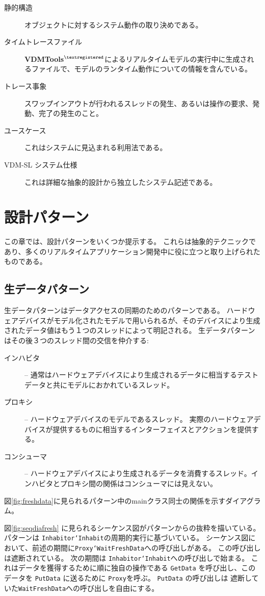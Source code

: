 \documentclass[\pformat,12pt]{jreport}
\newcommand{\vdmtools}{\textbf{VDMTools}$^{\mathbf{{\textregistered}}}$}
\begin{document}
\begin{description}
\item[静的構造] オブジェクトに対するシステム動作の取り決めである。
\item[タイムトレースファイル]  \vdmtools によるリアルタイムモデルの実行中に生成されるファイルで、モデルのランタイム動作についての情報を含んでいる。
\item[トレース事象] スワップインアウトが行われるスレッドの発生、あるいは操作の要求、発動、完了の発生のこと。
\item[ユースケース] これはシステムに見込まれる利用法である。
\item[VDM-SL システム仕様] これは詳細な抽象的設計から独立したシステム記述である。
\end{description}


\chapter{設計パターン}\label{app:patterns}

この章では、設計パターンをいくつか提示する。
これらは抽象的テクニックであり、多くのリアルタイムアプリケーション開発中に役に立つと取り上げられたものである。

\section{生データパターン}

生データパターンはデータアクセスの同期のためのパターンである。
ハードウェアデバイスがモデル化されたモデルで用いられるが、そのデバイスにより生成されたデータ値はもう１つのスレッドによって明記される。
生データパターンはその後３つのスレッド間の交信を仲介する:

\begin{description}
\item[インハビタ] -- 通常はハードウェアデバイスにより生成されるデータに相当するテストデータと共にモデルにおかれているスレッド。
\item[プロキシ] -- ハードウェアデバイスのモデルであるスレッド。
実際のハードウェアデバイスが提供するものに相当するインターフェイスとアクションを提供する。
\item[コンシューマ] -- ハードウェアデバイスにより生成されるデータを消費するスレッド。インハビタとプロキシ間の関係はコンシューマには見えない。
\end{description}

 図\ref{fig:freshdata}に見られるパターン中のmainクラス同士の関係を示すダイアグラム。

 図\ref{fig:seqdiafresh} に見られるシーケンス図がパターンからの抜粋を描いている。
パターンは \texttt{Inhabitor`Inhabit}の周期的実行に基づいている。
シーケンス図において、前述の期間に\texttt{Proxy`WaitFreshData}への呼び出しがある。
この呼び出しは遮断されている。
次の期間は \texttt{Inhabitor`Inhabit}への呼び出しで始まる。
これはデータを獲得するために順に独自の操作である \texttt{GetData} を呼び出し、このデータを \texttt{PutData} に送るために \texttt{Proxy}を呼ぶ。 
\texttt{PutData} の呼び出しは 遮断していた\texttt{WaitFreshData}への呼び出しを自由にする。
\end{document}
